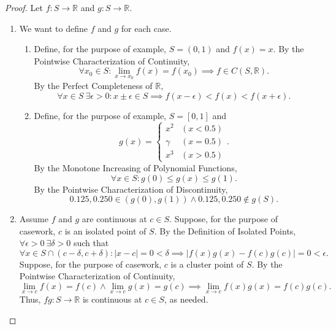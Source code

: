 \documentclass[12pt]{article}
\theoremstyle{definition}
\begin{document}
\begin{proof}
    Let \(f : S \to \mathbb{R}\) and \(g : S \to \mathbb{R}\).
    \begin{enumerate}[label=(\alph*)]
        \item We want to define \(f\) and \(g\) for each case. 
        \begin{enumerate}[label=(\roman*)]
            \item Define, for the purpose of example, \(S = (0, 1)\) and \(f(x) = x\). By the Pointwise Characterization of Continuity, 
            \[
                \forall x_0 \in S : \lim_{x \to x_0}f(x) = f(x_0) \implies f \in C(S, \mathbb{R}).
            \]
            By the Perfect Completeness of \(\mathbb{R}\),
            \[
                \forall x \in S \ \exists \epsilon > 0 : x \pm \epsilon \in S \implies f(x - \epsilon) < f(x) < f(x + \epsilon).
            \] 
            \item Define, for the purpose of example, \(S = [0, 1]\) and
            \[
                g(x) = \begin{cases}
                    x^2 & (x <0.5)\\
                    \gamma & (x = 0.5) \\ 
                    x^3 & (x > 0.5)
                \end{cases}.
            \]
            By the Monotone Increasing of Polynomial Functions,
            \[
                \forall x \in S : g(0) \leq g(x) \leq g(1).
            \]
            By the Pointwise Characterization of Discontinuity,
            \[
                0.125, 0.250 \in (g(0), g(1)) \land 0.125, 0.250 \not\in g(S). 
            \]
        \end{enumerate}
        \item Assume \(f\) and \(g\) are continuous at \(c \in S\). Suppose, for the purpose of casework, \(c\) is an isolated point of \(S\). By the Definition of Isolated Points, \(\forall \epsilon > 0 \ \exists \delta > 0 \) such that 
        \[
            \forall x \in S \cap (c - \delta, c + \delta) :\vert x - c \vert = 0 < \delta \implies \vert f(x)g(x) - f(c)g(c) \vert = 0 < \epsilon.
        \]
        Suppose, for the purpose of casework, \(c\) is a cluster point of \(S\). By the Pointwise Characterization of Continuity,
        \[
            \lim_{x \to c}f(x) = f(c) \land \lim_{x \to c}g(x) = g(c) \implies \lim_{x \to c}f(x)g(x) = f(c)g(c).
        \]
        Thus, \(fg : S \to \mathbb{R}\) is continuous at \(c \in S\), as needed. 
    \end{enumerate}
\end{proof}
\end{document}
